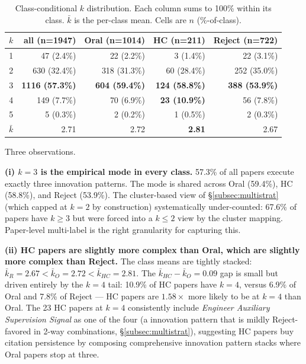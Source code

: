 \documentclass[10pt,a4paper]{article}
\begin{document}
\begin{table}[htbp]
\centering
\caption{Class-conditional \(k\) distribution. Each column sums to 100\% within its class. \(\bar{k}\) is the per-class mean. Cells are \(n\) (\%-of-class).}
\label{tab:k_dist}
\small
\begin{tabular}{c r r r r}
\toprule
\(k\) & all (n=1947) & Oral (n=1014) & HC (n=211) & Reject (n=722) \\
\midrule
1 &   47 (2.4\%) &  22 (2.2\%) &   3 (1.4\%) &  22 (3.1\%) \\
2 &  630 (32.4\%) & 318 (31.3\%) &  60 (28.4\%) & 252 (35.0\%) \\
3 & \textbf{1116 (57.3\%)} & \textbf{604 (59.4\%)} & \textbf{124 (58.8\%)} & \textbf{388 (53.9\%)} \\
4 &  149 (7.7\%) &  70 (6.9\%) &  \textbf{23 (10.9\%)} &  56 (7.8\%) \\
5 &    5 (0.3\%) &   2 (0.2\%) &   1 (0.5\%) &   2 (0.3\%) \\
\midrule
\(\bar{k}\) & 2.71 & 2.72 & \textbf{2.81} & 2.67 \\
\bottomrule
\end{tabular}
\end{table}

Three observations.

\textbf{(i) \(k{=}3\) is the empirical mode in every class.} 57.3\% of all papers execute exactly three innovation patterns. The mode is shared across Oral (59.4\%), HC (58.8\%), and Reject (53.9\%). The cluster-based view of \S\ref{subsec:multistrat} (which capped at \(k=2\) by construction) systematically under-counted: 67.6\% of papers have \(k \geq 3\) but were forced into a \(k \leq 2\) view by the cluster mapping. Paper-level multi-label is the right granularity for capturing this.

\textbf{(ii) HC papers are slightly more complex than Oral, which are slightly more complex than Reject.} The class means are tightly stacked: \(\bar{k}_R = 2.67 < \bar{k}_O = 2.72 < \bar{k}_{HC} = 2.81\). The \(\bar{k}_{HC} - \bar{k}_O = 0.09\) gap is small but driven entirely by the \(k{=}4\) tail: 10.9\% of HC papers have \(k=4\), versus 6.9\% of Oral and 7.8\% of Reject — HC papers are \(1.58\times\) more likely to be at \(k=4\) than Oral. The 23 HC papers at \(k{=}4\) consistently include \emph{Engineer Auxiliary Supervision Signal} as one of the four (a innovation pattern that is mildly Reject-favored in 2-way combinations, \S\ref{subsec:multistrat}), suggesting HC papers buy citation persistence by composing comprehensive innovation pattern stacks where Oral papers stop at three.
\end{document}
